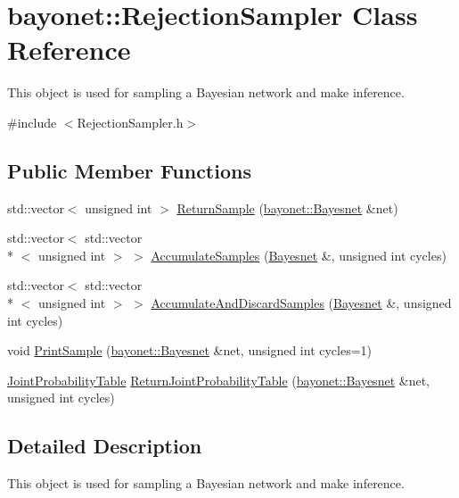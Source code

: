 \hypertarget{classbayonet_1_1_rejection_sampler}{\section{bayonet\-:\-:Rejection\-Sampler Class Reference}
\label{classbayonet_1_1_rejection_sampler}
}


This object is used for sampling a Bayesian network and make inference.  




{\ttfamily \#include $<$Rejection\-Sampler.\-h$>$}

\subsection*{Public Member Functions}
\begin{DoxyCompactItemize}
\item 
std\-::vector$<$ unsigned int $>$ \hyperlink{classbayonet_1_1_rejection_sampler_a1f2c685367f549965dcafd9c1b77ab1e}{Return\-Sample} (\hyperlink{classbayonet_1_1_bayesnet}{bayonet\-::\-Bayesnet} \&net)
\item 
std\-::vector$<$ std\-::vector\\*
$<$ unsigned int $>$ $>$ \hyperlink{classbayonet_1_1_rejection_sampler_aa5d0525c10cba1a99fba9e4233d8ac30}{Accumulate\-Samples} (\hyperlink{classbayonet_1_1_bayesnet}{Bayesnet} \&, unsigned int cycles)
\item 
std\-::vector$<$ std\-::vector\\*
$<$ unsigned int $>$ $>$ \hyperlink{classbayonet_1_1_rejection_sampler_ab63d7fa72ea2f9e8dfcd5f873d257df4}{Accumulate\-And\-Discard\-Samples} (\hyperlink{classbayonet_1_1_bayesnet}{Bayesnet} \&, unsigned int cycles)
\item 
void \hyperlink{classbayonet_1_1_rejection_sampler_ab68ff90b1c015d6aa2d185cacb18a74d}{Print\-Sample} (\hyperlink{classbayonet_1_1_bayesnet}{bayonet\-::\-Bayesnet} \&net, unsigned int cycles=1)
\item 
\hyperlink{classbayonet_1_1_joint_probability_table}{Joint\-Probability\-Table} \hyperlink{classbayonet_1_1_rejection_sampler_a0ba74f6d5f5fd61baa968464e2e3aac5}{Return\-Joint\-Probability\-Table} (\hyperlink{classbayonet_1_1_bayesnet}{bayonet\-::\-Bayesnet} \&net, unsigned int cycles)
\end{DoxyCompactItemize}


\subsection{Detailed Description}
This object is used for sampling a Bayesian network and make inference. 

